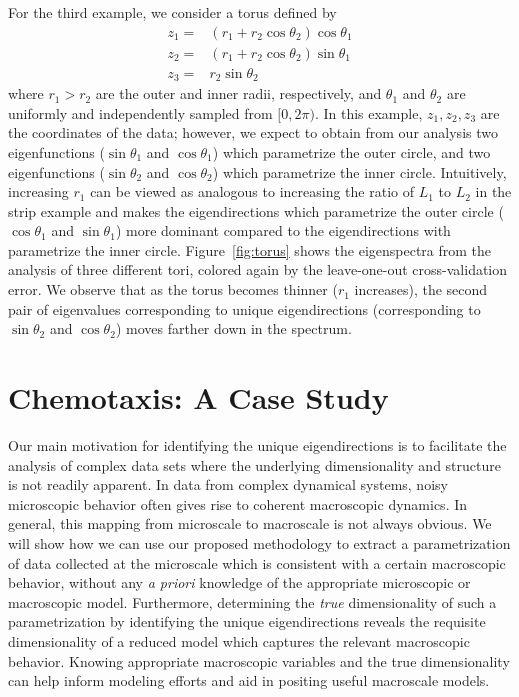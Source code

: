 \documentclass[3p]{elsarticle}
\begin{document}
For the third example, we consider a torus defined by
%
\begin{equation}
\begin{aligned}
z_1 =& (r_1 + r_2 \cos \theta_2 ) \cos \theta_1 \\
z_2 =& (r_1 + r_2 \cos \theta_2 ) \sin \theta_1 \\
z_3 =& r_2 \sin \theta_2
\end{aligned}
\label{eq:torus}
\end{equation}
%
where $r_1 > r_2$ are the outer and inner radii, respectively, and $\theta_1$ and $\theta_2$ are uniformly and independently sampled from $[0, 2\pi)$.
%
In this example, $z_1, z_2, z_3$ are the coordinates of the data; however, we expect to obtain from our analysis 
two eigenfunctions ($\sin \theta_1$ and $\cos \theta_1$) which parametrize the outer circle, and 
two eigenfunctions ($\sin \theta_2$ and $\cos \theta_2$) which parametrize the inner circle.
%
Intuitively, increasing $r_1$ can be viewed as analogous to increasing the ratio of $L_1$ to $L_2$ in the 
strip example and makes the eigendirections which parametrize the outer circle ($\cos \theta_1$ and $\sin \theta_1$) more 
dominant compared to the eigendirections with parametrize the inner circle.
%
Figure~\ref{fig:torus} shows the eigenspectra from the analysis of three different tori, colored again by the leave-one-out cross-validation error.
%
We observe that as the torus becomes thinner ($r_1$ increases), the second pair of eigenvalues corresponding to unique eigendirections (corresponding to $\sin \theta_2$ and $\cos \theta_2$) moves farther down in the spectrum.

\section{Chemotaxis: A Case Study}

Our main motivation for identifying the unique eigendirections is to facilitate the analysis of 
complex data sets where the underlying dimensionality and structure is not readily apparent.
%
In data from complex dynamical systems, noisy microscopic behavior often gives rise to coherent macroscopic dynamics.
%
In general, this mapping from microscale to macroscale is not always obvious.
%
We will show how we can use our proposed methodology to extract a parametrization of data collected 
at the microscale which is consistent with a certain macroscopic behavior, without any {\em a priori} knowledge of the appropriate 
microscopic or macroscopic model.
%
Furthermore, determining the {\em true} dimensionality of such a parametrization by identifying 
the unique eigendirections reveals the requisite dimensionality of a reduced model which captures the relevant macroscopic behavior.
%
Knowing appropriate macroscopic variables and the true dimensionality can help inform modeling efforts and aid in 
positing useful macroscale models.
\end{document}
